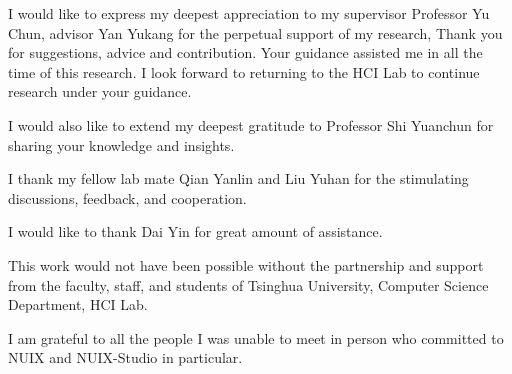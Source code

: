 
\begin{acknowledgements}

  I would like to express my deepest appreciation to my supervisor Professor Yu Chun, advisor Yan Yukang for the perpetual support of my research, Thank you for suggestions, advice and contribution. Your guidance assisted me in all the time of this research. I look forward to returning to the HCI Lab to continue research under your guidance. 
  
  I would also like to extend my deepest gratitude to Professor Shi Yuanchun for sharing your knowledge and insights. 
  
  I thank my fellow lab mate Qian Yanlin and Liu Yuhan for the stimulating discussions, feedback, and cooperation.
  
  I would like to thank Dai Yin for great amount of assistance.
  
  This work would not have been possible without the partnership and support from the faculty, staff, and students of Tsinghua University, Computer Science Department, HCI Lab. 
  
  I am grateful to all the people I was unable to meet in person who committed to NUIX and NUIX-Studio in particular.
   
\end{acknowledgements}

